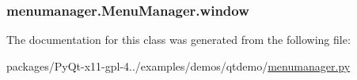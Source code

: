 \subsubsection[{window}]{\setlength{\rightskip}{0pt plus 5cm}menumanager.\+Menu\+Manager.\+window}\label{classmenumanager_1_1MenuManager_a5321154e44dbe3b5726a100768be6ecb}


The documentation for this class was generated from the following file\+:\begin{DoxyCompactItemize}
\item 
packages/\+Py\+Qt-\/x11-\/gpl-\/4../examples/demos/qtdemo/\hyperlink{menumanager_8py}{menumanager.\+py}\end{DoxyCompactItemize}
